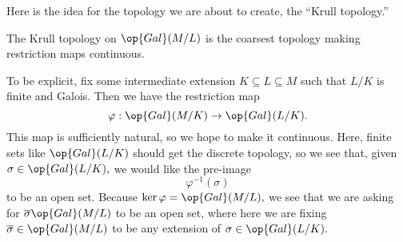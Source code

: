 Here is the idea for the topology we are about to create, the ``Krull topology.''
\begin{idea}
	The Krull topology on $\op{Gal}(M/L)$ is the coarsest topology making restriction maps continuous.
\end{idea}
To be explicit, fix some intermediate extension $K\subseteq L\subseteq M$ such that $L/K$ is finite and Galois. Then we have the restriction map
\[\varphi:\op{Gal}(M/K)\to\op{Gal}(L/K).\]
This map is sufficiently natural, so we hope to make it continuous. Here, finite sets like $\op{Gal}(L/K)$ should get the discrete topology, so we see that, given $\sigma\in\op{Gal}(L/K),$ we would like the pre-image
\[\varphi^{-1}(\sigma)\]
to be an open set. Because $\ker\varphi=\op{Gal}(M/L),$ we see that we are asking for $\overline\sigma\op{Gal}(M/L)$ to be an open set, where here we are fixing $\overline\sigma\in\op{Gal}(M/L)$ to be any extension of $\sigma\in\op{Gal}(L/K).$

